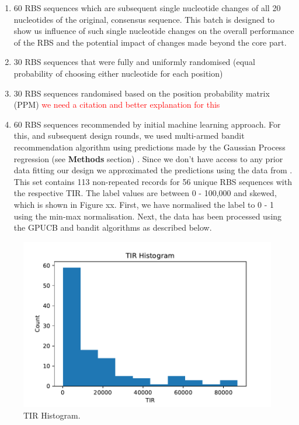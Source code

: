 \documentclass{article}
\begin{document}
\begin{enumerate}
    \item 60 RBS sequences which are subsequent single nucleotide changes of all 20 nucleotides of the original, consensus sequence. This batch is designed to show us influence of such single nucleotide changes on the overall performance of the RBS and the potential impact of changes made beyond the core part.
    \item 30 RBS sequences that were fully and uniformly randomised (equal probability of choosing either nucleotide for each position) 
    \item 30 RBS sequences randomised based on the position probability matrix (PPM) \textcolor{red}{we need a citation and better explanation for this}  
    \item 60 RBS sequences recommended by initial machine learning approach. For this, and subsequent design rounds, we used multi-armed bandit recommendation algorithm using predictions made by the Gaussian Process regression (see \textbf{Methods} section) \cite{srinivas2012information}. Since we don't have access to any prior data fitting our design we approximated the predictions using the data from \textcite{jervis2018machine}. This set contains 113 non-repeated records for 56 unique RBS sequences with the respective TIR. The label values are between 0 - 100,000 and skewed, which is shown in Figure xx. First, we have normalised the label to 0 - 1 using the min-max normalisation. Next, the data has been processed using the GPUCB and bandit algorithms as described below.
\end{enumerate}{}

\begin{figure}[t]
    \centering
    \includegraphics[scale=0.7]{plots/TIR_histogram.pdf}
    \caption{TIR Histogram.}
    \label{fig: TIR Histogram.}
\end{figure}
\end{document}
